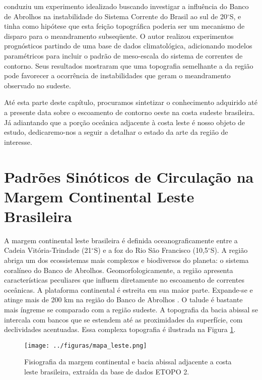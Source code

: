 \cite{soares2007} conduziu um
experimento idealizado buscando investigar a influência do Banco de Abrolhos
na instabilidade do Sistema Corrente do Brasil ao sul de 20$^\circ$S, e tinha como hipótese que 
esta feição topográfica poderia ser um mecanismo de disparo para o meandramento
subseq\"uente. O autor realizou experimentos prognósticos partindo de uma base de dados
climatológica, adicionando modelos paramétricos para incluir o padrão de meso-escala do sistema de correntes 
de contorno. Seus resultados mostraram que uma topografia semelhante a da região
pode favorecer a ocorrência de instabilidades que geram o meandramento observado no sudeste.

Até esta parte deste capítulo, procuramos sintetizar o conhecimento adquirido 
até a presente data sobre o escoamento de contorno oeste na costa sudeste 
brasileira. Já adiantando que a porção oceânica adjacente à costa leste é nosso objeto de estudo, 
dedicaremo-nos a seguir a detalhar o estado da arte da região de interesse.
  

\section{Padrões Sinóticos de Circulação na Margem Continental Leste Brasileira}\label{sec:cleste}

\hspace{6mm} A margem continental leste brasileira é definida oceanograficamente entre a Cadeia Vitória-Trindade (21$^\circ$S)
e a foz do Rio São Francisco (10,5$^\circ$S). A região abriga um dos ecossistemas mais complexos e biodiversos
do planeta: o sistema coralíneo do Banco de Abrolhos. Geomorfologicamente, 
a região apresenta características peculiares que influem diretamente no escoamento de correntes oceânicas.
A plataforma continental é estreita em sua maior parte. Expande-se e atinge mais de 200 km
na região do Banco de Abrolhos \citep{zembruscki1979}. O talude é bastante mais íngreme se comparado
com a região sudeste. A topografia da bacia abissal se intercala 
com bancos que se estendem até as proximidades da superfície, com declividades 
acentuadas. Essa complexa topografia é ilustrada na Figura \ref{fig:batimetria}.

\begin{figure}[hb]
 \begin{center}
  \texttt{[image: ../figuras/mapa\_leste.png]}
 \end{center}
 \vspace{-.5cm}
 \renewcommand{\baselinestretch}{1}
 \caption{\label{fig:batimetria} \small Fisiografia da margem continental e bacia abissal adjacente
a costa leste brasileira, extraída da base de dados ETOPO 2.}
\end{figure}
 

